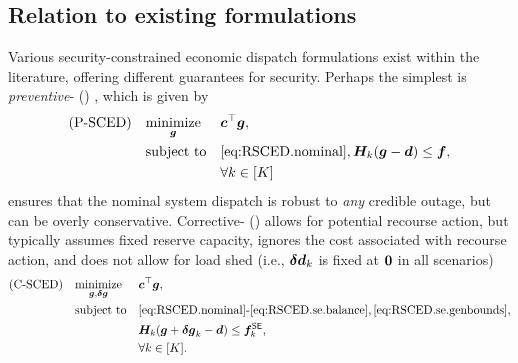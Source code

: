 
\subsection{Relation to existing formulations}
Various security-constrained economic dispatch formulations exist within the literature, offering different guarantees for security. Perhaps the simplest is \emph{preventive}-\SCED{} (\PSCED{}) \cite{alsac1974optimal}, which is given by
\begin{equation}\nonumber
\begin{aligned}
(\text{P-SCED}{})\quad& \underset{{\bm{g}}}{\text{minimize}} && {\bm{c}}^\top {\bm{g}}, \\
    & \text{subject to} && \eqref{eq:RSCED.nominal}, {\bm{H}}_k ({\bm{g}} - {\bm{d}}) \le {\bm{f}},\\
    &&& \forall k\in[K]
\end{aligned}
\end{equation}
\PSCED{} ensures that the nominal system dispatch is robust to \emph{any} credible outage, but can be overly conservative. Corrective-\SCED{} (\CSCED{}) \cite{monticelli1987security} allows for potential recourse action, but typically assumes fixed reserve capacity, 
ignores the cost associated with recourse action, and does not allow for load shed (i.e., ${\bm{\delta d}}_k$ is fixed at ${\bm{0}}$ in all scenarios)
\begin{equation}\label{eq:csced}
\begin{aligned}
    (\CSCED{})\quad&\underset{\v{g}, \v{\delta g}}{\text{minimize}} && \v{c}^\top \v{g}, \\
    & \text{subject to} && \eqref{eq:RSCED.nominal} \text{-} \eqref{eq:RSCED.se.balance}, \eqref{eq:RSCED.se.genbounds}, \\
    &&& \v{H}_k (\v{g} + \v{\delta g}_k - \v{d}) \le \v{f}_k^\SE{},\\
     &&& \forall k \in [K].%
\end{aligned}
\end{equation}
